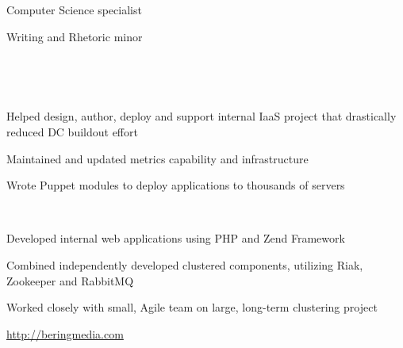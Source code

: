 \documentclass[letterpaper,11pt,notitlepage]{article}
\begin{document}

\vbar
{}
    \begin{employment}
        \item Computer Science specialist
        \item Writing and Rhetoric minor
    \end{employment}
    \\

\vbar
{}
         \\
        \begin{employment}
            \item Helped design, author, deploy and support internal IaaS
                  project that drastically reduced DC buildout effort
            \item Maintained and updated metrics capability and infrastructure
            \item Wrote Puppet modules to deploy applications to thousands of servers
        \end{employment}
         \\
        \begin{employment}
            \item Developed internal web applications using PHP and Zend
            Framework
            \item Combined independently developed clustered components,
            utilizing Riak, Zookeeper and RabbitMQ
            \item Worked closely with small, Agile team on large, long-term
            clustering project
            \item \url{http://beringmedia.com}
        \end{employment}
         \\
\end{document}
